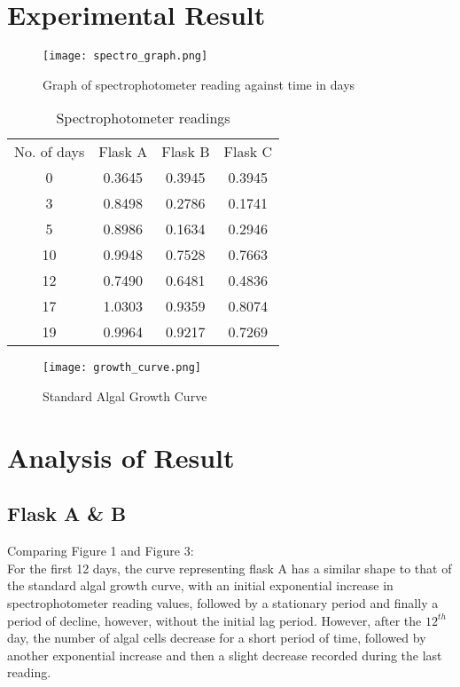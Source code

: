\documentclass[12pt,a4paper]{IEEEtran}
\begin{document}
    \section{Experimental Result}
    \begin{figure}[H]
    	\begin{center}
    		\texttt{[image: spectro\_graph.png]}
    		\caption{Graph of spectrophotometer reading against time in days}
    		\label{fig:spectrograph}
    	\end{center}
    \end{figure}
	\begin{table}[H]
		\centering
		\caption{Spectrophotometer readings}
		\label{tab:spectrotable}
		\small
		\begin{tabular}{|c|c|c|c|}
			No. of days & Flask A & Flask B & Flask C \\
			0           & 0.3645  & 0.3945  & 0.3945  \\
			3           & 0.8498  & 0.2786  & 0.1741  \\
			5           & 0.8986  & 0.1634  & 0.2946  \\
			10          & 0.9948  & 0.7528  & 0.7663  \\
			12          & 0.7490  & 0.6481  & 0.4836  \\
			17          & 1.0303  & 0.9359  & 0.8074  \\
			19          & 0.9964  & 0.9217  & 0.7269          
		\end{tabular}
		\normalsize
	\end{table}
	\begin{figure}[H]
		\begin{center}
			\texttt{[image: growth\_curve.png]}
			\caption{Standard Algal Growth Curve}
			\label{growthcurve}
		\end{center}
	\end{figure}
    \section{Analysis of Result}
    \subsection{Flask A \& B}
    Comparing Figure 1 and Figure 3: \\
    
    For the first 12 days, the curve representing flask A has a similar shape to that of the standard algal growth curve, with an initial exponential increase in spectrophotometer reading values, followed by a stationary period and finally a period of decline, however, without the initial lag period. However, after the $12^{th}$ day, the number of algal cells decrease for a short period of time, followed by another exponential increase and then a slight decrease recorded during the last reading. \\
    
\end{document}

